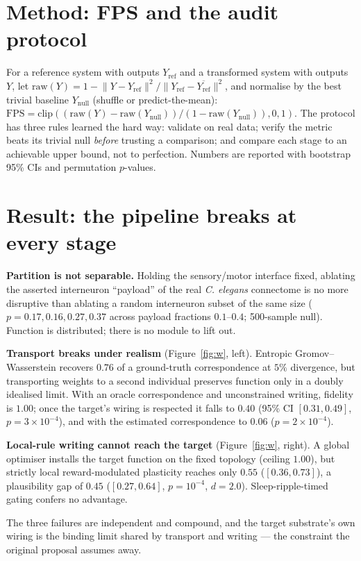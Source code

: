 \documentclass[10pt]{article}
\begin{document}
\section{Method: FPS and the audit protocol}
For a reference system with outputs $Y_{\mathrm{ref}}$ and a transformed system with outputs $Y$,
let $\mathrm{raw}(Y)=1-\lVert Y-Y_{\mathrm{ref}}\rVert^2/\lVert Y_{\mathrm{ref}}-\overline{Y_{\mathrm{ref}}}\rVert^2$,
and normalise by the best trivial baseline $Y_{\mathrm{null}}$ (shuffle or predict-the-mean):
$\mathrm{FPS}=\mathrm{clip}((\mathrm{raw}(Y)-\mathrm{raw}(Y_{\mathrm{null}}))/(1-\mathrm{raw}(Y_{\mathrm{null}})),0,1)$.
The protocol has three rules learned the hard way: validate on real data; verify the metric beats
its trivial null \emph{before} trusting a comparison; and compare each stage to an achievable
upper bound, not to perfection. Numbers are reported with bootstrap 95\% CIs and permutation
$p$-values.

\section{Result: the pipeline breaks at every stage}
\textbf{Partition is not separable.} Holding the sensory/motor interface fixed, ablating the
asserted interneuron ``payload'' of the real \emph{C. elegans} connectome is no more disruptive
than ablating a random interneuron subset of the same size ($p=0.17,0.16,0.27,0.37$ across payload
fractions $0.1$--$0.4$; 500-sample null). Function is distributed; there is no module to lift out.

\textbf{Transport breaks under realism} (Figure~\ref{fig:w}, left). Entropic Gromov--Wasserstein
recovers $0.76$ of a ground-truth correspondence at $5\%$ divergence, but transporting weights to a
second individual preserves function only in a doubly idealised limit. With an oracle
correspondence and unconstrained writing, fidelity is $1.00$; once the target's wiring is respected
it falls to $0.40$ (95\% CI $[0.31,0.49]$, $p=3\times10^{-4}$), and with the estimated
correspondence to $0.06$ ($p=2\times10^{-4}$).

\textbf{Local-rule writing cannot reach the target} (Figure~\ref{fig:w}, right). A global optimiser
installs the target function on the fixed topology (ceiling $1.00$), but strictly local
reward-modulated plasticity reaches only $0.55$ ($[0.36,0.73]$), a plausibility gap of $0.45$
($[0.27,0.64]$, $p=10^{-4}$, $d=2.0$). Sleep-ripple-timed gating confers no advantage.

The three failures are independent and compound, and the target substrate's own wiring is the
binding limit shared by transport and writing --- the constraint the original proposal assumes away.
\end{document}
